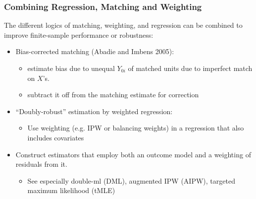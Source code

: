 \documentclass[xcolor=dvipsnames]{beamer}
\newcommand\makegaps{\addtolength{\itemsep}{.25\baselineskip}}
\begin{document}
\begin{frame}
\frametitle{Combining Regression, Matching and Weighting}
 The different logics of matching, weighting, and regression can be combined to improve finite-sample performance or robustness: \\

\begin{itemize}
\small
\makegaps
\item<2-> Bias-corrected matching (Abadie and Imbens 2005): 
\footnotesize
	\begin{itemize}
	\makegaps
	\item estimate bias due to unequal $Y_{0i}$ of matched units due to imperfect match on  $X$'s. 
	\item subtract it off from the matching estimate for correction
	\end{itemize}
\small
\item<3-> ``Doubly-robust'' estimation by weighted regression:
\footnotesize
	\begin{itemize}
	\makegaps
	\item Use weighting (e.g. IPW or balancing weights) in a regression that also includes covariates
	\end{itemize}
	\item<4-> Construct estimators that employ both an outcome model and a weighting of residuals from it.
	\begin{itemize}
	\item See especially double-ml (DML), augmented IPW (AIPW), targeted maximum likelihood (tMLE)
	\end{itemize}
	\small
\end{itemize}
\end{frame}
\end{document}
